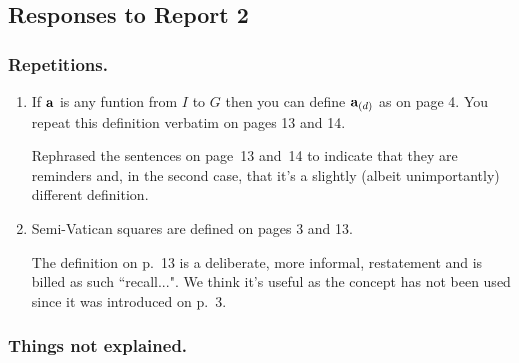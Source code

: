\documentclass[12pt,a4paper]{article}
\newenvironment{QandA}{\begin{enumerate}[label=\bfseries\alph*.]\bfseries}
                      {\end{enumerate}}
\newenvironment{answered}{\par\normalfont}{}
\begin{document}
\subsection*{Responses to Report 2}


\subsubsection*{Repetitions.}

\begin{QandA}

\item
If ${\bf a}$ is any funtion from $I$ to $G$ then you can define ${\bf a}_{(d)}$ as on page 4. You repeat
this definition verbatim on pages 13 and 14.

\begin{answered}
Rephrased the sentences on page~13 and~14 to indicate that they are reminders and, in the second case, that it's a slightly (albeit unimportantly) different definition.
\end{answered}

\item
Semi-Vatican squares are defined on pages 3 and 13.

\begin{answered}
The definition on p.~13 is a deliberate, more informal, restatement and is billed as such ``recall...".  We think it's useful as the concept has not been used since it was introduced on p.~3.
\end{answered}

\end{QandA}

\subsubsection*{Things not explained.}
\end{document}
